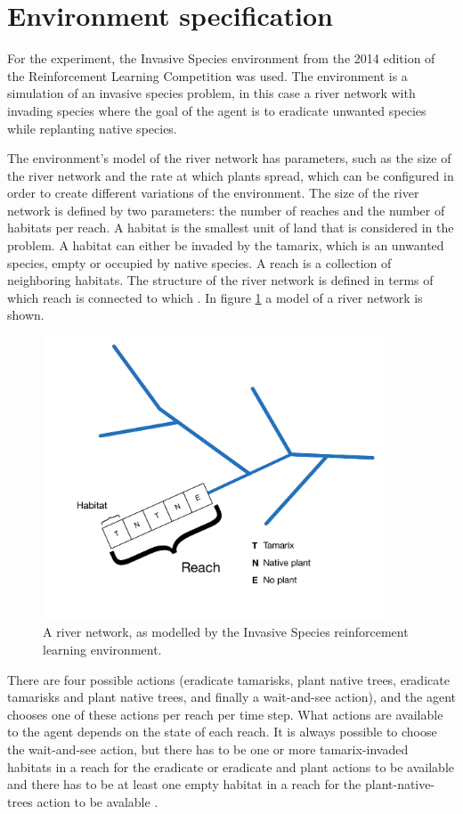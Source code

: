 \section{Environment specification}
\label{sec:experiment_env}

For the experiment, the Invasive Species environment from the 2014 edition of
the Reinforcement Learning Competition was used. The environment is a
simulation of an invasive species problem, in this case a river network with
invading species where the goal of the agent is to eradicate unwanted species
while replanting native species. 

The environment's model of the river network has parameters, such as the size
of the river network and the rate at which plants spread, which can be
configured in order to create different variations of the environment.  The
size of the river network is defined by two parameters: the number of reaches
and the number of habitats per reach. A habitat is the smallest unit of land
that is considered in the problem. A habitat can either be invaded by the
tamarix, which is an unwanted species, empty or occupied by native species. A
reach is a collection of neighboring habitats. The structure of the river
network is defined in terms of which reach is connected to which
\parencite{invasiveSpecis2014:Online}. In figure \ref{fig:river} a model of a
river network is shown.

\begin{figure}[ht]
\centering
\includegraphics[width=0.9\textwidth]{images/river_network.pdf}
\caption{A river network, as modelled by the Invasive Species reinforcement learning environment.}
\label{fig:river}
\end{figure}

There are four possible actions (eradicate tamarisks, plant native trees,
eradicate tamarisks and plant native trees, and finally a wait-and-see action),
and the agent chooses one of these actions per reach per time step. What
actions are available to the agent depends on the state of each reach. It is
always possible to choose the wait-and-see action, but there has to be one
or more tamarix-invaded habitats in a reach for the eradicate or eradicate and
plant actions to be available and there has to be at least one empty habitat in
a reach for the plant-native-trees action to be avalable
\parencite{invasiveSpecis2014:Online}. 
